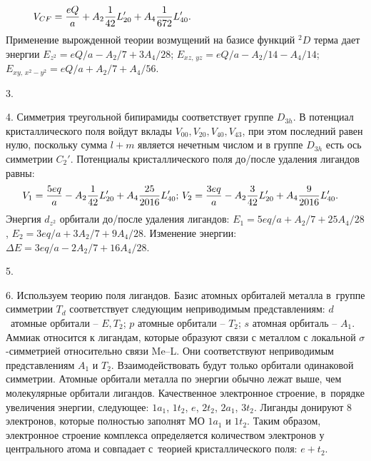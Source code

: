\begin{equation*}
\begin{aligned}
& V_{CF}= \dfrac{eQ}{a} + A_2 \dfrac{1}{42}L_{20}' + A_4 \dfrac{1 }{672}L_{40}'. \hspace{48mm}
\end{aligned}
\end{equation*}
Применение вырожденной теории возмущений на базисе функций $^2D$ терма дает энергии $E_{z^2} = eQ/a - A_2/7 + {3A_4}/{28}$; $E_{xz,\, yz} = eQ/a -{A_2}/{14} - {A_4}/{14}$; $E_{xy,\,x^2-y^2} = eQ/a + {A_2}/{7} + {A_4}/{56}$.\par
3. \par
4. Симметрия треугольной бипирамиды соответствует группе $D_{3h}$. В потенциал кристаллического поля войдут вклады $V_{00}, V_{20}, V_{40}, V_{43}$, при этом последний равен нулю, поскольку сумма $l + m $ является нечетным числом и в группе $D_{3h}$ есть ось симметрии $C_2'$. Потенциалы кристаллического поля до/после удаления лигандов равны: 
\begin{equation*}
\begin{aligned}
& V_{1}= \dfrac{5eq}{a} - A_2 \dfrac{1}{42}L_{20}' + A_4 \dfrac{ 25 }{2016} L_{40}'; \, V_{2}= \dfrac{3eq}{a} - A_2 \dfrac{3}{42}L_{20}' + A_4 \dfrac{ 9 }{2016} L_{40}' . \hspace{0mm}
\end{aligned}
\end{equation*}
Энергия $d_{z^2}$ орбитали до/после удаления лигандов: $E_1= 5eq/a + {A_2}/{7} + {25A_4}/{28}$, $E_2= 3eq/a + {3A_2}/{7} + {9A_4}/{28}$. Изменение энергии: $\Delta E= 3eq/a - {2A_2}/{7} + {16A_4}/{28}$.\par
5. \par
6. Используем теорию поля лигандов. Базис атомных орбиталей металла в~группе симметрии $T_d$ соответствует следующим неприводимым представлениям: $d$~атомные орбитали – $E, T_2$; $p$ атомные орбитали – $T_2$; $s$ атомная орбиталь – $A_1$. Аммиак относится к лигандам, которые образуют связи с металлом с локальной $\sigma$-симметрией относительно связи Me–L. Они соответствуют неприводимым представлениям $A_1$ и $T_2$. Взаимодействовать будут только орбитали одинаковой симметрии. Атомные орбитали металла по энергии обычно лежат выше, чем молекулярные орбитали лигандов. Качественное электронное строение, в~порядке увеличения энергии, следующее: $1a_1$, $1t_2$, $e$, $2t_2$, $2a_1$, $3t_2$. Лиганды донируют 8 электронов, которые полностью заполнят МО $1a_1$ и $1t_2$. Таким образом, электронное строение комплекса определяется количеством электронов у центрального атома и совпадает с~теорией кристаллического поля: $e+t_2$.\par
